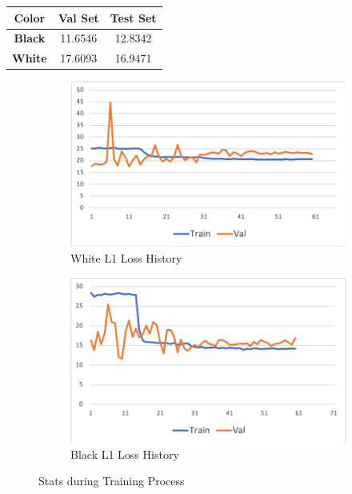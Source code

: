 \documentclass[10pt,twocolumn,letterpaper]{article}
\begin{document}
\begin{minipage}{\linewidth}
   \centering
\begin{tabular}{ccc}
   \toprule
   Color & Val Set & Test Set\\
   \midrule
   \textbf{Black} & 11.6546 & 12.8342\\
   \textbf{White} & 17.6093 & 16.9471\\
   \bottomrule
   \end{tabular}
    \label{tab:prevdataset}

\end{minipage}

\begin{figure}[h!]
   \begin{subfigure}{0.25\textwidth}
      \centering
      \includegraphics[width=\linewidth]{fig/vel_1.png}
      \caption{White L1 Loss History} \label{fig:k}
    \end{subfigure}\hspace*{\fill}
    \begin{subfigure}{0.25\textwidth}
      \centering
      \includegraphics[width=\linewidth]{fig/vel_3.png}
      \caption{Black L1 Loss History} \label{fig:k}
    \end{subfigure}\hspace*{\fill}
   \caption{Stats during Training Process} \label{fig:6}
\end{figure}   
\end{document}
